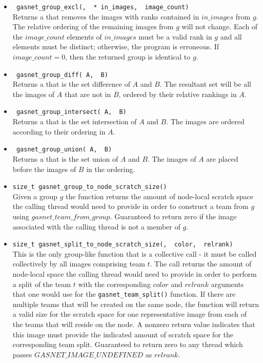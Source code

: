 \documentclass[times,10pt]{article}
\begin{document}
\begin{itemize}
\item \texttt{\group\ gasnet\_group\_excl(\grouparg, \image\ * in\_images, \image\ image\_count)} \\ 
Returns a \texttt{\group} that removes the images with ranks contained in $in\_images$
from $g$. The relative ordering of the remaining images from $g$ will not change. 
Each of the $image\_count$ elements of $in\_images$
must be a valid rank in $g$ and all elements must be distinct; otherwise, the program is
erroneous. If $image\_count = 0$, then the returned group is identical to $g$.


\item \texttt{\group\ gasnet\_group\_diff(\group\ A, \group\ B)} \\ 
Returns a \texttt{\group} that is the set difference of $A$ and $B$. The
resultant set will be all the images of $A$ that are not in $B$, ordered by
their relative rankings in $A$. 

\item \texttt{\group\ gasnet\_group\_intersect(\group\ A, \group\ B)} \\ 
Returns a \texttt{\group} that is the set intersection of $A$ and $B$. The
images are ordered according to their ordering in $A$. 

\item \texttt{\group\ gasnet\_group\_union(\group\ A, \group\ B)} \\ 
Returns a \texttt{\group} that is the set union of $A$ and $B$.  The images of
$A$ are placed before the images of $B$ in the ordering. 

\item \texttt{size\_t gasnet\_group\_to\_node\_scratch\_size(\grouparg)} \\ 
Given a group $g$ the function returns the amount of node-local scratch space 
the calling thread would need to provide in order to construct a team from $g$
using $gasnet\_team\_from\_group$. Guaranteed to return zero if the image 
associated with the calling thread is not a member of $g$.

\item \texttt{size\_t gasnet\_split\_to\_node\_scratch\_size(\teamarg, \image\ color, \image\ relrank)} \\ 
This is the only group-like function that is a collective call - it must be called collectively by
all images comprising team $t$.
The call returns the amount of node-local space the calling thread would need to provide in order to
perform a split of the team $t$ with the corresponding $color$ and $relrank$
arguments that one would use for the \texttt{gasnet\_team\_split()} function.
If there are multiple teams that will be created
on the same node, the function will return a valid size for the scratch space
for one representative image from each of the teams that will reside on the
node. A nonzero return value indicates that this image must provide the indicated
amount of scratch space for the corresponding team split. 
Guaranteed to return zero to any thread which passes $GASNET\_IMAGE\_UNDEFINED$ as $relrank$.


\end{itemize}
\end{document}
